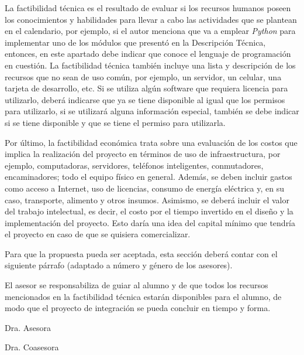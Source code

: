 La factibilidad técnica es el resultado de evaluar si los recursos humanos poseen los conocimientos y habilidades para llevar a cabo las actividades que se plantean en el calendario, por ejemplo, si el autor menciona que va a emplear \textit{Python} para implementar uno de los módulos que presentó en la Descripción Técnica, entonces, en este apartado debe indicar que conoce el lenguaje de programación en cuestión. La factibilidad técnica también incluye una lista y descripción de los recursos que no sean de uso común, por ejemplo, un servidor, un celular, una tarjeta de desarrollo, etc. Si se utiliza algún software que requiera licencia para utilizarlo, deberá indicarse que ya se tiene disponible al igual que los permisos para utilizarlo, si se utilizará alguna información especial, también se debe indicar si se tiene disponible y que se tiene el permiso para utilizarla. 

Por último, la factibilidad económica trata sobre una evaluación de los costos que implica la realización del proyecto en términos de uso de infraestructura, por ejemplo, computadoras, servidores, teléfonos inteligentes, conmutadores, encaminadores; todo el equipo físico en general. Además, se deben incluir gastos como acceso a Internet, uso de licencias, consumo de energía eléctrica y, en su caso, transporte, alimento y otros insumos. Asimismo, se deberá incluir el valor del trabajo intelectual, es decir, el costo por el tiempo invertido en el diseño y la implementación del proyecto. Esto daría una idea del capital mínimo que tendría el proyecto en caso de que se quisiera comercializar.

Para que la propuesta pueda ser aceptada, esta sección deberá contar con el siguiente párrafo (adaptado a número y género de los asesores). 

El asesor se responsabiliza de guiar al alumno y de que todos los recursos mencionados en la factibilidad técnica estarán disponibles para el alumno, de modo que el proyecto de integración se pueda concluir en tiempo y forma.\\[1.5cm]

\begin{center}
  \begin{minipage}{0.4\textwidth}
    \centering
    Dra. Asesora %
  \end{minipage}
  \begin{minipage}{0.4\textwidth}
    \centering
    Dra. Coasesora %
  \end{minipage}
\end{center}